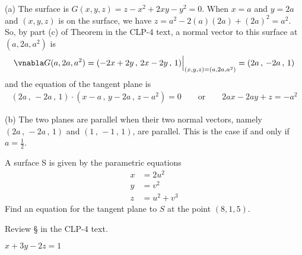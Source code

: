 \begin{solution}
(a)
The surface is $G(x,y,z)=z-x^2+2xy-y^2=0$. When $x=a$ and $y=2a$
 and $(x,y,z)$ is on the surface, we have $z= a^2-2(a)(2a) +(2a)^2=a^2$.
So, by part (c) of Theorem  
in the CLP-4 text, 
a normal vector to this surface at $(a,2a,a^2)$ is
\begin{align*}
\vnabla G(a,2a,a^2) = ( -2x+2y\,,\,2x-2y\,,\,1)\Big|_{(x,y,z)=(a,2a,a^2)}
                    = ( 2a\,,\,-2a\,,\,1)
\end{align*}
and the equation of the tangent plane is 
\begin{align*}
( 2a\,,\,-2a\,,\,1)\cdot( x-a\,,\,y-2a\,,\,z-a^2) =0
\qquad\text{or}\qquad
2ax -2ay +z = -a^2
\end{align*}

(b) The two planes are parallel when their two normal vectors,
namely $( 2a\,,\,-2a\,,\,1)$ and $( 1\,,\,-1\,,\,1)$,
are parallel. This is the case if and only if $a=\frac{1}{2}$.
\end{solution}


\begin{question}[M317 2008D] %
A surface S is given by the parametric equations
\begin{align*}
x &= 2u^2 \\
y &= v^2 \\
z &= u^2 + v^3
\end{align*}
Find an equation for the tangent plane to $S$ at the point $(8, 1, 5)$.
\end{question}

\begin{hint} 
Review \S{} in the CLP-4 text.
\end{hint}

\begin{answer} 
$x+3y-2z = 1$
\end{answer}

